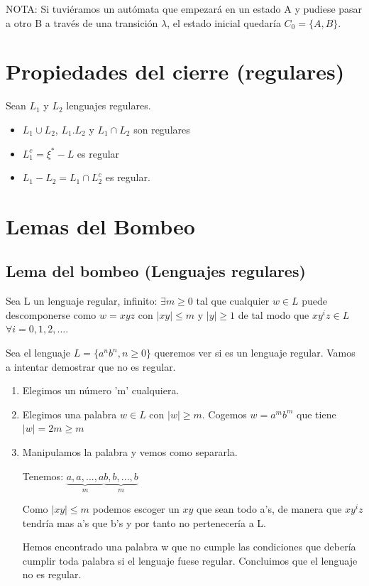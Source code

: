 \documentclass{apuntes}
\begin{document}
NOTA: Si tuviéramos un autómata que empezará en un estado A y pudiese pasar a otro B a través de una transición $\lambda$, el estado inicial quedaría $C_0=\{A,B\}$.

\section{Propiedades del cierre (regulares)}
Sean $L_1$ y $L_2$ lenguajes regulares.
\begin{itemize}
\item $L_1 \cup L_2$, $L_1.L_2$ y $L_1 \cap L_2$ son regulares
\item $L_1^c = \xi^* - L$ es regular
\item $L_1 - L_2 = L_1 \cap L_2^c$ es regular.
\end{itemize}


\section{Lemas del Bombeo}

\subsection{Lema del bombeo (Lenguajes regulares)}
Sea L un lenguaje regular, infinito: $\exists m\geq 0$ tal que cualquier $w\in L$ puede descomponerse como $w=xyz$ con $|xy|\leq m$ y $|y|\geq 1$ de tal modo que $xy^iz \in L$ $\forall i=0,1,2,...$.

\begin{example}
Sea el lenguaje $L=\{a^nb^n, n\geq 0\}$ queremos ver si es un lenguaje regular. Vamos a intentar demostrar que no es regular.
\begin{enumerate}

\item Elegimos un número 'm' cualquiera.
\item Elegimos una palabra $w\in L$ con $|w| \geq m$. Cogemos $w=a^mb^m$ que tiene $|w|= 2m \geq m$
\item Manipulamos la palabra y vemos como separarla.

Tenemos: $\underbrace{a,a,...,a}_m \underbrace{b,b,...,b}_m$

Como $|xy| \leq m$ podemos escoger un $xy$ que sean todo a's, de manera que $xy^iz$ tendría mas a's que b's y por tanto no pertenecería a L.


Hemos encontrado una palabra w que no cumple las condiciones que debería cumplir toda palabra si el lenguaje fuese regular. Concluimos que el lenguaje no es regular.
\end{enumerate}
\end{example}
\end{document}
